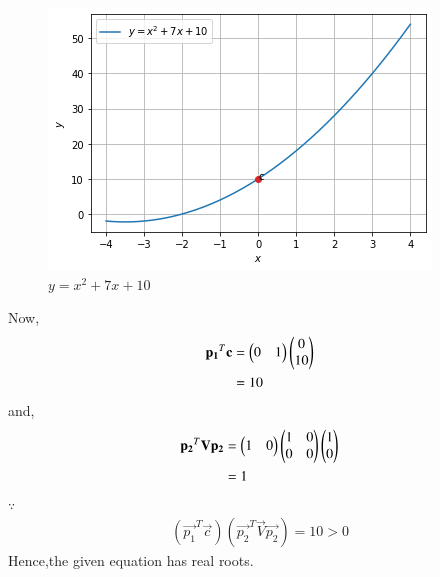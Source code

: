 \documentclass[journal,12pt,twocolumn]{IEEEtran}
\begin{document}
\begin{figure}[!ht]
\centering
\includegraphics[width=\columnwidth]{download.png}
\caption{$y=x^2+7x+10$}
\label{ex3}	
\end{figure}
Now,
\begin{align}
\mathbf{p_1}^T\mathbf{c} &= \begin{pmatrix}0 & 1\end{pmatrix}\begin{pmatrix}0\\10\end{pmatrix}
\\
&= 10
\end{align}
and,
\begin{align}
\mathbf{p_2}^T\mathbf{V}\mathbf{p_2} &= \begin{pmatrix}1 & 0\end{pmatrix}\begin{pmatrix}1 & 0\\0& 0\end{pmatrix}\begin{pmatrix}1 \\ 0\end{pmatrix}
\\
&= 1
\end{align}
$\because$
\begin{align}
(\vec{p_1}^T\vec{c})(\vec{p_2}^T\vec{V}\vec{p_2}) = 10>0
\end{align}
Hence,the given equation has real roots.
\end{document}
